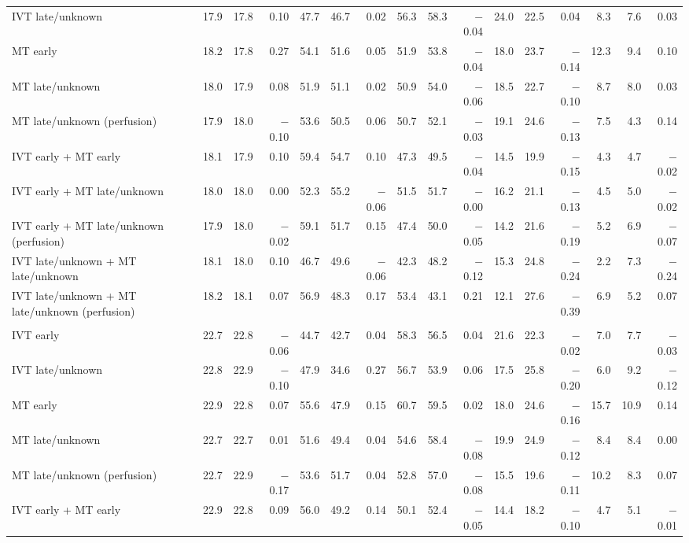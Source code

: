 \begin{landscape}
\begin{longtable}{p{5.6cm}rrrrrrrrrrrrrrr}
IVT late/unknown & 17.9 & 17.8 & 0.10 & 47.7 & 46.7 & 0.02 & 56.3 & 58.3 & $-$0.04 & 24.0 & 22.5 & 0.04 & 8.3 & 7.6 & 0.03 \\
MT early & 18.2 & 17.8 & 0.27 & 54.1 & 51.6 & 0.05 & 51.9 & 53.8 & $-$0.04 & 18.0 & 23.7 & $-$0.14 & 12.3 & 9.4 & 0.10 \\
MT late/unknown & 18.0 & 17.9 & 0.08 & 51.9 & 51.1 & 0.02 & 50.9 & 54.0 & $-$0.06 & 18.5 & 22.7 & $-$0.10 & 8.7 & 8.0 & 0.03 \\
MT late/unknown (perfusion) & 17.9 & 18.0 & $-$0.10 & 53.6 & 50.5 & 0.06 & 50.7 & 52.1 & $-$0.03 & 19.1 & 24.6 & $-$0.13 & 7.5 & 4.3 & 0.14 \\
IVT early + MT early & 18.1 & 17.9 & 0.10 & 59.4 & 54.7 & 0.10 & 47.3 & 49.5 & $-$0.04 & 14.5 & 19.9 & $-$0.15 & 4.3 & 4.7 & $-$0.02 \\
IVT early + MT late/unknown & 18.0 & 18.0 & 0.00 & 52.3 & 55.2 & $-$0.06 & 51.5 & 51.7 & $-$0.00 & 16.2 & 21.1 & $-$0.13 & 4.5 & 5.0 & $-$0.02 \\
IVT early + MT late/unknown (perfusion) & 17.9 & 18.0 & $-$0.02 & 59.1 & 51.7 & 0.15 & 47.4 & 50.0 & $-$0.05 & 14.2 & 21.6 & $-$0.19 & 5.2 & 6.9 & $-$0.07 \\
IVT late/unknown + MT late/unknown & 18.1 & 18.0 & 0.10 & 46.7 & 49.6 & $-$0.06 & 42.3 & 48.2 & $-$0.12 & 15.3 & 24.8 & $-$0.24 & 2.2 & 7.3 & $-$0.24 \\
IVT late/unknown + MT late/unknown (perfusion) & 18.2 & 18.1 & 0.07 & 56.9 & 48.3 & 0.17 & 53.4 & 43.1 & 0.21 & 12.1 & 27.6 & $-$0.39 & 6.9 & 5.2 & 0.07 \\
\addlinespace
\multicolumn{16}{l}{\textbf{NIHSS 21--25}}\\
IVT early & 22.7 & 22.8 & $-$0.06 & 44.7 & 42.7 & 0.04 & 58.3 & 56.5 & 0.04 & 21.6 & 22.3 & $-$0.02 & 7.0 & 7.7 & $-$0.03 \\
IVT late/unknown & 22.8 & 22.9 & $-$0.10 & 47.9 & 34.6 & 0.27 & 56.7 & 53.9 & 0.06 & 17.5 & 25.8 & $-$0.20 & 6.0 & 9.2 & $-$0.12 \\
MT early & 22.9 & 22.8 & 0.07 & 55.6 & 47.9 & 0.15 & 60.7 & 59.5 & 0.02 & 18.0 & 24.6 & $-$0.16 & 15.7 & 10.9 & 0.14 \\
MT late/unknown & 22.7 & 22.7 & 0.01 & 51.6 & 49.4 & 0.04 & 54.6 & 58.4 & $-$0.08 & 19.9 & 24.9 & $-$0.12 & 8.4 & 8.4 & 0.00 \\
MT late/unknown (perfusion) & 22.7 & 22.9 & $-$0.17 & 53.6 & 51.7 & 0.04 & 52.8 & 57.0 & $-$0.08 & 15.5 & 19.6 & $-$0.11 & 10.2 & 8.3 & 0.07 \\
IVT early + MT early & 22.9 & 22.8 & 0.09 & 56.0 & 49.2 & 0.14 & 50.1 & 52.4 & $-$0.05 & 14.4 & 18.2 & $-$0.10 & 4.7 & 5.1 & $-$0.01 \\

\end{longtable}
\end{landscape}
